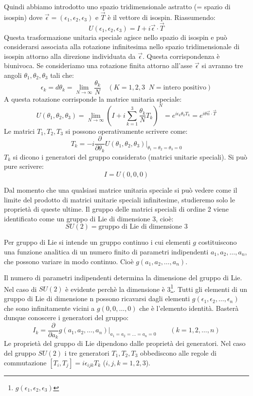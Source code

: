 Quindi abbiamo introdotto uno spazio tridimensionale astratto (= spazio di
isospin) dove $\vec{\epsilon}=(\epsilon_1,\epsilon_2,\epsilon_3)$ e $\vec{T}$ è
il vettore di isospin. Riassumendo:
\begin{equation}
U(\epsilon_1,\epsilon_2,\epsilon_3)=I+i\vec{\epsilon}\cdot\vec{T}
\end{equation}
Questa trasformazione unitaria speciale agisce nello spazio di isospin e può
considerarsi associata alla rotazione infinitesima nello spazio tridimensionale
di isospin attorno alla direzione individuata da $\vec{\epsilon}$.
Questa corrispondenza è biunivoca. Se consideriamo una rotazione finita attorno
all'asse $\vec{\epsilon}$ si avranno tre angoli $\theta_1,\theta_2,\theta_3$
tali che:
\[
\epsilon_k=d\theta_k=\lim_{N\to\infty}\frac{\theta_k}{N}\quad(K=1,2,3\;\;N=\text
{intero positivo})
\]
A questa rotazione corrisponde la matrice unitaria speciale:
\begin{equation}
U(\theta_1,\theta_2,\theta_3)=\lim_{N\to\infty}(I+i\sum_{k=1}^3\frac{\theta_k}{N
}T_k)^N=e^{i\epsilon_k\theta_kT_k}=e^{i\theta\vec{n}\cdot\vec{T}}
\end{equation}
Le matrici $T_1,T_2,T_3$ si possono operativamente scrivere come:
\begin{equation}
T_k=-i\frac{\partial}{\partial\theta_k}U(\theta_1,\theta_2,\theta_3)\bigr\vert_{
\theta_1=\theta_2=\theta_3=0}
\end{equation}
$T_k$ si dicono i generatori del gruppo considerato (matrici unitarie speciali).
Si può pure scrivere:
\[
I=U(0,0,0)
\]

Dal momento che una qualsiasi matrice unitaria speciale si può vedere come il
limite del prodotto di matrici unitarie speciali infinitesime, studieremo solo
le proprietà di queste ultime.
Il gruppo delle matrici speciali di ordine 2 viene identificato come un gruppo
di Lie di dimensione 3, cioè:
\begin{equation}
SU(2)=\text{gruppo di Lie di dimensione }3
\end{equation}

Per gruppo di Lie si intende un gruppo continuo i cui elementi $g$ costituiscono
una funzione analitica di un numero finito di parametri indipendenti
$a_1,a_2,\dots,a_n$, che possono variare in modo continuo.
Cioè $g(a_1,a_2,\dots,a_n)$.

Il numero di parametri indipendenti determina la dimensione del gruppo di Lie.
Nel caso di $SU(2)$ è evidente perchè la dimensione è
3\footnote{$g(\epsilon_1,\epsilon_2,\epsilon_3)$}.
Tutti gli elementi di un gruppo di Lie di dimensione n possono ricavarsi dagli
elementi $g(\epsilon_1,\epsilon_2,\dots,\epsilon_n)$ che sono infinitamente
vicini a $g(0,0,\dots,0)$ che è l'elemento identità.
Basterà dunque conoscere i generatori del gruppo:
\begin{equation}
I_k=\frac{\partial}{\partial a_k}g(a_1,a_2,\dots ,a_n)\bigr\vert_{a_1=a_2=\dots 
=a_n=0}\qquad (k=1, 2, \dots , n)
\end{equation}
Le proprietà del gruppo di Lie dipendono dalle proprietà dei generatori. Nel
caso del gruppo $SU(2)$ i tre generatori $T_1,T_2,T_3$ obbediscono alle regole
di commutazione $[T_i,T_j]=i\epsilon_{ijk}T_k$ ($i,j,k=1,2,3$).

